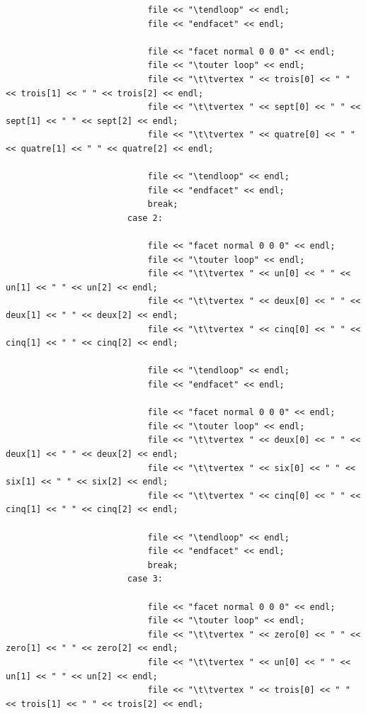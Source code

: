 \documentclass{article}
\begin{document}
\begin{lstlisting}
                            file << "\tendloop" << endl;
                            file << "endfacet" << endl;

                            file << "facet normal 0 0 0" << endl;
                            file << "\touter loop" << endl;
                            file << "\t\tvertex " << trois[0] << " " << trois[1] << " " << trois[2] << endl;
                            file << "\t\tvertex " << sept[0] << " " << sept[1] << " " << sept[2] << endl;
                            file << "\t\tvertex " << quatre[0] << " " << quatre[1] << " " << quatre[2] << endl;

                            file << "\tendloop" << endl;
                            file << "endfacet" << endl;
                            break;
                        case 2:

                            file << "facet normal 0 0 0" << endl;
                            file << "\touter loop" << endl;
                            file << "\t\tvertex " << un[0] << " " << un[1] << " " << un[2] << endl;
                            file << "\t\tvertex " << deux[0] << " " << deux[1] << " " << deux[2] << endl;
                            file << "\t\tvertex " << cinq[0] << " " << cinq[1] << " " << cinq[2] << endl;

                            file << "\tendloop" << endl;
                            file << "endfacet" << endl;

                            file << "facet normal 0 0 0" << endl;
                            file << "\touter loop" << endl;
                            file << "\t\tvertex " << deux[0] << " " << deux[1] << " " << deux[2] << endl;
                            file << "\t\tvertex " << six[0] << " " << six[1] << " " << six[2] << endl;
                            file << "\t\tvertex " << cinq[0] << " " << cinq[1] << " " << cinq[2] << endl;

                            file << "\tendloop" << endl;
                            file << "endfacet" << endl;
                            break;
                        case 3:

                            file << "facet normal 0 0 0" << endl;
                            file << "\touter loop" << endl;
                            file << "\t\tvertex " << zero[0] << " " << zero[1] << " " << zero[2] << endl;
                            file << "\t\tvertex " << un[0] << " " << un[1] << " " << un[2] << endl;
                            file << "\t\tvertex " << trois[0] << " " << trois[1] << " " << trois[2] << endl;


\end{lstlisting}
\end{document}
